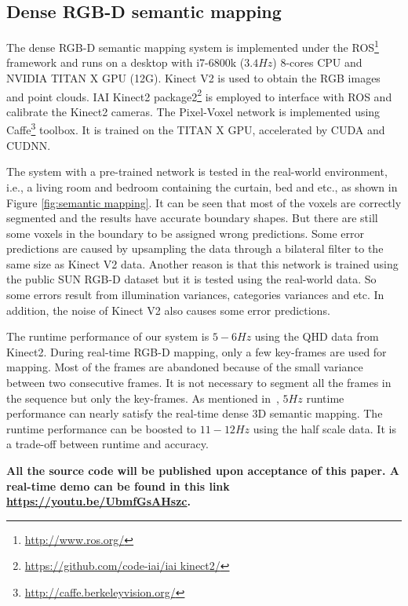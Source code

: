 \documentclass[letterpaper, 10 pt, conference]{ieeeconf}
\begin{document}
\subsection{Dense RGB-D semantic mapping}\label{sec:4.4}
The dense RGB-D semantic mapping system is implemented under the ROS\footnote{\url{http://www.ros.org/}} framework and runs on a desktop with i7-6800k ($3.4Hz$) 8-cores CPU and NVIDIA TITAN X GPU (12G). Kinect V2 is used to obtain the RGB images and point clouds. IAI Kinect2 package2\footnote{\url{https://github.com/code-iai/iai kinect2/}} is employed to interface with ROS and calibrate the Kinect2 cameras. The Pixel-Voxel network is implemented using Caffe\footnote{\url{http://caffe.berkeleyvision.org/}} toolbox. It is trained on the TITAN X GPU, accelerated by CUDA and CUDNN.

The system with a pre-trained network is tested in the real-world environment, i.e., a living room and bedroom containing the curtain, bed and etc., as shown in Figure \ref{fig:semantic mapping}. It can be seen that most of the voxels are correctly segmented and the results have accurate boundary shapes. But there are still some voxels in the boundary to be assigned wrong predictions. Some error predictions are caused by upsampling the data through a bilateral filter to the same size as Kinect V2 data. Another reason is that this network is trained using the public SUN RGB-D dataset but it is tested using the real-world data. So some errors result from illumination variances, categories variances and etc. In addition, the noise of Kinect V2 also causes some error predictions.   

The runtime performance of our system is $5-6Hz$ using the QHD data from Kinect2. During real-time RGB-D mapping, only a few key-frames are used for mapping. Most of the frames are abandoned because of the small variance between two consecutive frames. It is not necessary to segment all the frames in the sequence but only the key-frames. As mentioned in~\cite{hermans2014dense}, $5Hz$ runtime performance can nearly satisfy the real-time dense 3D semantic mapping. The runtime performance can be boosted to $11-12Hz$ using the half scale data. It is a trade-off between runtime and accuracy.

\textbf{All the source code will be published upon acceptance of this paper. A real-time demo can be found in this link \url{https://youtu.be/UbmfGsAHszc}.}

\end{document}
